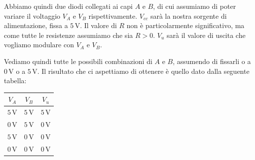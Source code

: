 \documentclass[a4paper,11pt]{article}
\begin{document}
Abbiamo quindi due diodi collegati ai capi $A$ e $B$, di cui assumiamo di poter variare il voltaggio $V_A$ e $V_B$ rispettivamente. $V_{cc}$ sarà la nostra sorgente di alimentazione, fissa a $5 \, \mathrm{V}$. Il valore di $R$ non è particolarmente significativo, ma come tutte le resistenze assumiamo che sia $R > 0$. $V_u$ sarà il valore di uscita che vogliamo modulare con $V_A$ e $V_B$.

Vediamo quindi tutte le possibili combinazioni di $A$ e $B$, assumendo di fissarli o a $0 \, \mathrm{V}$ o a $5 \, \mathrm{V}$.
Il risultato che ci aspettiamo di ottenere è quello dato dalla seguente tabella:
\begin{table}[h!]
	\center 
	\begin{tabular} { c | c || c }
		$V_A$ & $V_B$ & $V_u$ \\
		\hline
		$5 \, \mathrm{V}$ & $5 \, \mathrm{V}$ & $5 \, \mathrm{V}$ \\
		$0 \, \mathrm{V}$ & $5 \, \mathrm{V}$ & $0 \, \mathrm{V}$ \\
		$5 \, \mathrm{V}$ & $0 \, \mathrm{V}$ & $0 \, \mathrm{V}$ \\
		$0 \, \mathrm{V}$ & $0 \, \mathrm{V}$ & $0 \, \mathrm{V}$ \\
	\end{tabular}
\end{table}

\newpage
\end{document}
